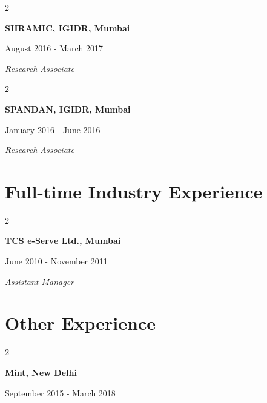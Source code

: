 \documentclass[10pt]{article}
\begin{document}
\vspace{0.3cm}

\begin{multicols}{2}
    \begin{flushleft}{\bf SHRAMIC, IGIDR, Mumbai}\end{flushleft}
    \begin{flushright}August 2016 - March 2017\end{flushright}
  \end{multicols}
  \vspace{-.3cm}

\textit{Research Associate}

\vspace{0.3cm}

\begin{multicols}{2}
    \begin{flushleft}{\bf SPANDAN, IGIDR, Mumbai}\end{flushleft}
    \begin{flushright}January 2016 - June 2016\end{flushright}
  \end{multicols}
  \vspace{-.3cm}

\textit{Research Associate}

\section*{Full-time Industry Experience}

\begin{multicols}{2}
    \begin{flushleft}{\bf  TCS e-Serve Ltd., Mumbai}\end{flushleft}
    \begin{flushright} June 2010 - November 2011\end{flushright}
  \end{multicols}
  \vspace{-.3cm}

\textit{Assistant Manager}

\section*{Other Experience}

\begin{multicols}{2}
    \begin{flushleft}{\bf  Mint, New Delhi}\end{flushleft}
    \begin{flushright} September 2015 - March 2018\end{flushright}
  \end{multicols}
  \vspace{-.3cm}
\end{document}

